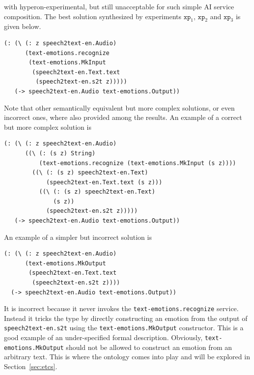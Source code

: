 \documentclass[]{report}
\begin{document}
with hyperon-experimental, but still unacceptable for such simple AI
service composition.  The best solution synthesized by experiments
$\texttt{xp}_1$, $\texttt{xp}_2$ and $\texttt{xp}_3$ is given below.
\begin{verbatim}
(: (\ (: z speech2text-en.Audio)
      (text-emotions.recognize
       (text-emotions.MkInput
        (speech2text-en.Text.text
         (speech2text-en.s2t z)))))
   (-> speech2text-en.Audio text-emotions.Output))
\end{verbatim}
Note that other semantically equivalent but more complex solutions, or
even incorrect ones, where also provided among the results.  An
example of a correct but more complex solution is
\begin{verbatim}
(: (\ (: z speech2text-en.Audio)
      ((\ (: (s z) String)
          (text-emotions.recognize (text-emotions.MkInput (s z))))
        ((\ (: (s z) speech2text-en.Text)
            (speech2text-en.Text.text (s z)))
          ((\ (: (s z) speech2text-en.Text)
              (s z))
            (speech2text-en.s2t z)))))
   (-> speech2text-en.Audio text-emotions.Output))
\end{verbatim}
An example of a simpler but incorrect solution is
\begin{verbatim}
(: (\ (: z speech2text-en.Audio)
      (text-emotions.MkOutput
       (speech2text-en.Text.text
        (speech2text-en.s2t z))))
  (-> speech2text-en.Audio text-emotions.Output))
\end{verbatim}
It is incorrect because it never invokes the
\texttt{text-emotions.recognize} service.  Instead it
tricks the type by directly constructing an emotion from the output of
\texttt{speech2text-en.s2t} using the
\texttt{text-emotions.MkOutput} constructor.  This is a
good example of an under-specified formal description.  Obviously,
\texttt{text-emotions.MkOutput} should not be allowed to
construct an emotion from an arbitrary text.  This is where the
ontology comes into play and will be explored in
Section~\ref{sec:etcs}.
\end{document}
